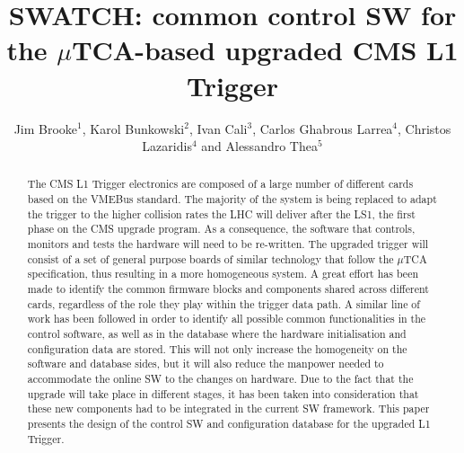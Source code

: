 \documentclass[a4paper]{jpconf}
\begin{document}
\title{SWATCH: common control SW for the $\mu$TCA-based upgraded CMS L1 Trigger}

\author{Jim Brooke$^1$, Karol Bunkowski$^2$, Ivan Cali$^3$, Carlos Ghabrous Larrea$^4$, Christos Lazaridis$^4$ and Alessandro Thea$^5$}

\address{$^1$ H.H. Wills Physics Laboratory, University of Bristol, U.K.}
\address{$^2$ Institute of Experimental Physics, University of Warsaw, Poland.}
\address{$^3$ Laboratory for Nuclear Science, Massachusetts Institute of Technology, U.S.A.}
\address{$^4$ Department of Physics, University of Wisconsin-Madison, U.S.A.}
\address{$^5$ Rutherford Appleton Laboratory, STFC, Harwell, U.K.}


\begin{abstract}
The CMS L1 Trigger electronics are composed of a large number of different cards based on the VMEBus standard. The majority of the system is being replaced to adapt the trigger to the higher collision rates the LHC will deliver after the LS1, the first phase on the CMS upgrade program. As a consequence, the software that controls, monitors and tests the hardware will need to be re-written. 
The upgraded trigger will consist of a set of general purpose boards of similar technology that follow the $\mu$TCA specification, thus resulting in a more homogeneous system. A great effort has been made to identify the common firmware blocks and components shared across different cards, regardless of the role they play within the trigger data path. A similar line of work has been followed in order to identify all possible common functionalities in the control software, as well as in the database where the hardware initialisation and configuration data are stored. This will not only increase the homogeneity on the software and database sides, but it will also reduce the manpower needed to accommodate the online SW to the changes on hardware. Due to the fact that the upgrade will take place in different stages, it has been taken into consideration that these new components had to be integrated in the current SW framework. 
This paper presents the design of the control SW and configuration database for the upgraded L1 Trigger. 
\end{abstract}
\end{document}
